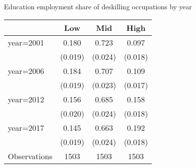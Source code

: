 \begin{center}
\begin{threeparttable}[!h]
\caption{Education employment share of deskilling occupations by year}
\begin{tabular}{lccc}
\toprule
\toprule
\textbf{}&\multicolumn{1}{c}{\textbf{Low}}&\multicolumn{1}{c}{\textbf{Mid}}&\multicolumn{1}{c}{\textbf{High}} \\
\midrule
year=2001           &       0.180&       0.723&       0.097\\
                    &     (0.019)&     (0.024)&     (0.018)\\
year=2006           &       0.184&       0.707&       0.109\\
                    &     (0.019)&     (0.023)&     (0.017)\\
year=2012           &       0.156&       0.685&       0.158\\
                    &     (0.020)&     (0.024)&     (0.018)\\
year=2017           &       0.145&       0.663&       0.192\\
                    &     (0.019)&     (0.024)&     (0.018)\\
Observations        &        1503&        1503&        1503\\
\bottomrule
\bottomrule
\end{tabular}
\end{threeparttable}
\end{center}
